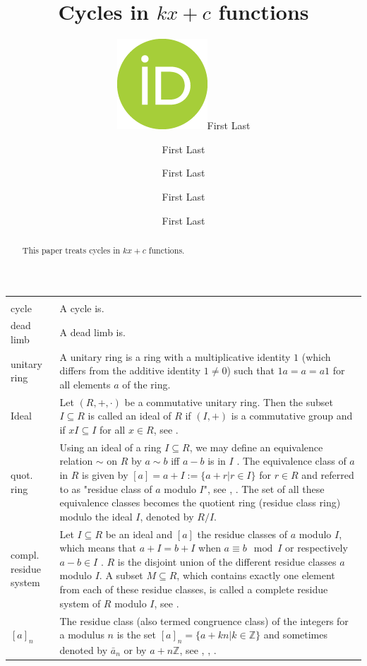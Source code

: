 \documentclass[12pt]{amsart}
\title[Cycles in kx+c functions]{Cycles in $kx+c$ functions}
\author[F.\ Last1]{\href{https://orcid.org/0000-0000-0000-0000}{\includegraphics[scale=0.06]{orcid.png}}\hspace{1mm}First Last}
\author[F.\ Last2]{First Last}
\author[F.\ Last3]{First Last}
\author[F.\ Last4]{First Last}
\author[F.\ Last5]{First Last}
\theoremstyle{definition}
\begin{document}
	
\begingroup
\let\MakeUppercase\relax
\maketitle
\endgroup

\begin{abstract}
This paper treats cycles in $kx+c$ functions. 
\end{abstract}

\newpage
{\renewcommand{\arraystretch}{1.8}
\begin{table}[H]
	\centering
	\begin{tabular}{|P{1.4cm} p{13.4cm}|}
		\hline
		\\
		cycle & A cycle is.
		\\
		dead limb & A dead limb is.
		\\
		unitary ring & A unitary ring is a ring with a multiplicative identity $1$ (which differs from the additive identity $1\ne0$) such that $1a=a=a1$ for all elements $a$ of the ring.
		\\
		Ideal & Let $(R,+,\cdot)$ be a commutative unitary ring. Then the subset $I\subseteq R$ is called an ideal of $R$ if $(I,+)$ is a commutative group and if $xI\subseteq I$ for all $x\in R$, see \cite[p.~66-67]{Ref_Wolfart_2011}.
		\\
		quot. ring & Using an ideal of a ring $I\subseteq R$, we may define an equivalence relation $\sim$ on $R$ by $a\sim b$ iff $a-b$ is in $I$ \cite[p.~69]{Ref_Schulze-Pillot_2015}. The equivalence class of $a$ in $R$ is given by $[a]=a+I:=\{a+r|r\in I\}$ for $r\in R$ and referred to as "residue class of $a$ modulo $I$", see \cite[p.~122]{Ref_Schubert_2012}, \cite[p.~70]{Ref_Schulze-Pillot_2015}. The set of all these equivalence classes becomes the quotient ring (residue class ring) modulo the ideal $I$, denoted by $R/I$.
		\\
		compl. residue system & Let $I\subseteq R$ be an ideal and $[a]$ the residue classes of $a$ modulo $I$, which means that $a+I=b+I$ when $a\equiv b\mod I$ or respectively $a-b\in I$ \cite[p.~70]{Ref_Schulze-Pillot_2015}. $R$ is the disjoint union of the different residue classes $a$ modulo $I$. A subset $M\subseteq R$, which contains exactly one element from each of these residue classes, is called a complete residue system of $R$ modulo $I$, see \cite[p.~70]{Ref_Schulze-Pillot_2015}.
		\\
		$[a]_n$ & The residue class (also termed congruence class) of the integers for a modulus $n$ is the set $[a]_n=\{a+kn|k\in\mathbb{Z}\}$ and sometimes denoted by $\bar a_n$ or by $a+n\mathbb{Z}$, see \cite[p.~15]{Ref_Wolfart_2011}, \cite[p.~122]{Ref_Schubert_2012}, \cite[p.~25]{Ref_Mueller-Stach_2011}.

\end{tabular}
\end{table}}
\end{document}
